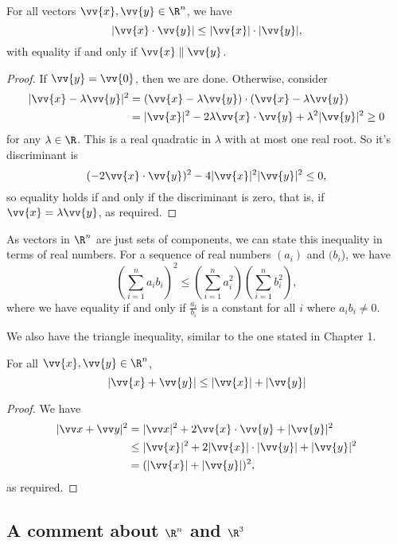 \begin{proposition}
    For all vectors $\vv{x}, \vv{y} \in \R^n$, we have
    $$
|\vv{x} \cdot \vv{y}| \leq |\vv{x} | \cdot |\vv{y}|,
    $$
    with equality if and only if $\vv{x} \parallel \vv{y}$.
\end{proposition}
\begin{proof}
    If $\vv{y} = \vv{0}$, then we are done. Otherwise, consider
    \begin{align*}
        |\vv{x} - \lambda \vv{y}|^2 &= (\vv{x} - \lambda\vv{y}) \cdot (\vv{x} - \lambda \vv{y}) \\
        &= |\vv{x}|^2 - 2 \lambda \vv{x} \cdot \vv{y} + \lambda^2 |\vv{y}|^2 \geq 0
    \end{align*}
    for any $\lambda \in \R$. This is a real quadratic in $\lambda$ with at most one real root. So it's discriminant is
    $$
    (-2 \vv{x} \cdot \vv{y})
^2 - 4|\vv{x}|^2 |\vv{y}|^2 \leq 0,    $$
so equality holds if and only if the discriminant is zero, that is, if $\vv{x} = \lambda \vv{y}$, as required.
\end{proof}

As vectors in $\R^n$ are just sets of components, we can state this inequality in terms of real numbers.
    For a sequence of real numbers $(a_i)$ and $(b_i$), we have
    $$
\left(\sum_{i = 1}^n a_i b_i\right)^2 \leq \left(\sum_{i = 1}^n a_i^2 \right)\left(\sum_{i = 1}^n b_i^2 \right),
    $$
    where we have equality if and only if $\frac{a_i}{b_i}$ is a constant for all $i$ where $a_i b_i \neq 0$.

We also have the triangle inequality, similar to the one stated in Chapter 1.

\begin{proposition}
    For all $\vv{x},\vv{y} \in \R^n$,
    $$
    |\vv{x} + \vv{y} |\leq |\vv{x}| + |\vv{y}|
    $$
\end{proposition}
\begin{proof}
We have
\begin{align*}
    |\vv x + \vv y|^2 &= |\vv x|^2 + 2 \vv{x}\cdot \vv{y} + |\vv{y}|^2 \\
    &\leq |\vv{x}|^2 + 2 |\vv{x}| \cdot |\vv{y}| + |\vv{y}|^2 \\
    &= (|\vv{x}| + |\vv{y}|)^2,
\end{align*}
as required.
\end{proof}

\subsection{A comment about $\R^n$ and $\R^3$}

